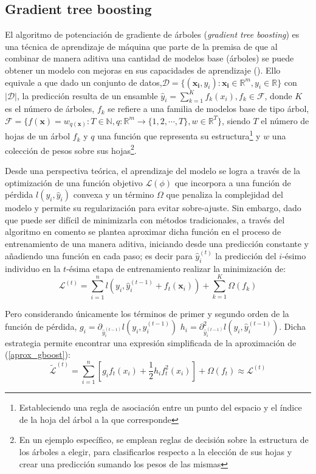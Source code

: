 \documentclass[9pt,twocolumn,twoside]{ilcss}
\begin{document}
\subsection{Gradient tree boosting}
El algoritmo de potenciación de gradiente de árboles (\emph{gradient tree boosting}) es una técnica de aprendizaje de máquina que parte de la premisa de que al combinar de manera aditiva una cantidad de modelos base (árboles) se puede obtener un modelo con mejoras en sus capacidades de aprendizaje (\cite{Chen:2016:XST:2939672.2939785}). Ello equivale a que dado un conjunto de datos,${\mathcal D} =\{(\mathbf{x_i}, y_i) : \mathbf{x_i}\in  \mathbb{R}^m, y_i\in  \mathbb{R} \}$ con $|{\mathcal D}|$, la predicción resulta de un ensamble $\hat{y}_i = \sum_{k=1}^K f_k(x_i), f_k \in \mathcal{F}$, donde $K$ es el número de árboles, $f_k$ se refiere a una familia de modelos base de tipo árbol, $\mathcal{F}=\{ f(\mathbf{x}) = w_{q(\mathbf{x})} :  T\in \mathbb{N}, q: \mathbb{R}^m \rightarrow \{1,2,\cdots,T\} ,  w\in \mathbb{R}^T  \}$, siendo $T$ el número de hojas de un árbol $f_k$ y $q$ una función que representa su estructura\footnote{Estableciendo una regla de asociación entre un punto del espacio y el índice de la hoja del árbol a la que corresponde} y $w$ una colección de pesos sobre sus hojas\footnote{En un ejemplo específico, se emplean reglas de decisión sobre la estructura de los árboles a elegir, para clasificarlos respecto a la elección de sus hojas y crear una predicción sumando los pesos de las mismas}.

Desde una perspectiva teórica, el aprendizaje del modelo se logra a través de la optimización de una función objetivo ${\mathcal L}(\phi)$ que incorpora a una función de pérdida $l(y_i, \hat{y}_i)$ convexa 
y un término $\Omega$ que penaliza la complejidad del modelo y permite su regularización para evitar sobre-ajuste. Sin embargo, dado que puede ser difícil de minimizarla con métodos tradicionales, a través del algoritmo en comento se plantea aproximar dicha función en el proceso de entrenamiento de una manera aditiva, iniciando desde una predicción constante y añadiendo una función en cada paso; es decir para $\hat{y}_i^{(t)}$ la predicción del $i$-ésimo individuo en la $t$-ésima etapa de entrenamiento realizar la minimización de:
\begin{equation}\label{aprox_gboost}
{\mathcal L}^{(t)} = \sum_{i=1}^n l(y_i, \hat{y}_i^{(t-1)}+f_t(\mathbf{x}_i)) + \sum_{k=1}^K \Omega(f_k)
\end{equation}

Pero considerando únicamente los términos de primer y segundo orden de la función de pérdida, $g_i = \partial_{\hat{y}_i^{(t-1)}} l(y_i, \hat{y}_i^{(t-1)})$  $h_i = \partial_{\hat{y}_i^{(t-1)}}^2 l(y_i, \hat{y}_i^{(t-1)})$. Dicha estrategia permite encontrar una expresión simplificada de la aproximación de (\ref{aprox_gboost}):
\begin{equation}
\tilde{{\mathcal L}}^{(t)} =\sum_{i=1}^n [g_i f_t(x_i) + \frac{1}{2} h_i f_t^2(x_i)] + \Omega(f_t) \approx {\mathcal L}^{(t)}
\end{equation}
\end{document}
